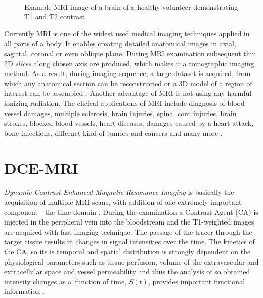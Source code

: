  
\begin{figure}
\captionsetup[subfloat]{captionskip=0.5cm}
	\centering
	\hspace{1.5cm}
	\\	
\vspace{0.5cm}
\caption[Comparison of \textit{T\textsubscript{1}} and \textit{T\textsubscript{2}} weighted images]{Example MRI image of a brain of a healthy volunteer demonstrating T1 and T2 contrast}
\label{fig:t1t2}
\end{figure}

Currently MRI is one of the widest used medical imaging techniques applied in all parts of a body. It enables creating detailed anatomical images in axial, sagittal, coronal or even oblique plane. During MRI examination subsequent thin 2D \textit{slices} along chosen axis are produced, which makes it a tomographic imaging method. As a result, during imaging sequence, a large dataset is acquired, from which any anatomical section can be reconstructed or a 3D model of a region of interest can be assembled \cite {bushong2014magnetic}. Another advantage of MRI is not using any harmful ionizing radiation.
The clicical applications of MRI include diagnosis of blood vessel damages, multiple sclerosis, brain injuries, spinal cord injuries, brain strokes, blocked blood vessels, heart diseases, damages caused by a heart attack, bone infections, differnet kind of tumors and cancers and many more \cite{mriApplications}.

\section{DCE-MRI}
\textit{Dynamic Contrast Enhanced Magnetic Resonance Imaging} is basically the acquisition of multiple MRI scans, with addition of one extremely important component---the time domain \cite{jackson2005dynamic}. During the examination a Contrast Agent (CA) is injected in the peripheral vein into the bloodstream and the T1-weighted images are acquired with fast imaging technique. 
The passage of the tracer through the target tissue results in changes in signal intensities over the time.
The kinetics of the CA, so its is temporal and spatial distribution is strongly dependent on the physiological parameters such as tissue perfusion, volume of the extravascular and extracellular space and vessel permeability and thus the analysis of so obtained intensity changes as a~function of time, $S(t)$, provides important functional information \cite{bokacheva2008assessment, khalifa2014models}. 

